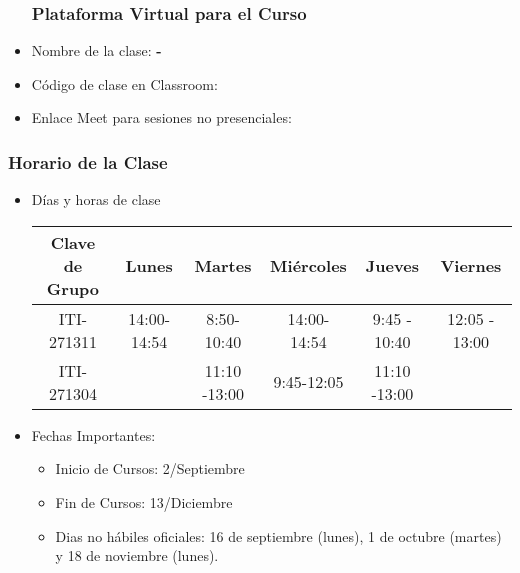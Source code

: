 


\begin{frame}
\begin{itemize}
\frametitle{Plataforma Virtual para el Curso}
\item Nombre de la clase: \textbf{\nombreMateria-\cuatrimestre}
\item Código de clase en Classroom: \textbf{\claveClassroom}
\item Enlace Meet para sesiones no presenciales: \textbf{\claveMeet}
\end{itemize}
\end{frame}



\begin{frame}
\frametitle{Horario de la Clase}


\begin{itemize}
\item Días y horas de clase
\tiny
\begin{spacing}{1.0}
\begin{center}
\begin{tabular}{c|ccccc}
\hline 
\textbf{Clave de Grupo}   & Lunes        & Martes       & Miércoles    & Jueves         & Viernes         \\  \hline 
ITI-271311                & 14:00- 14:54 &  8:50- 10:40 & 14:00-14:54  &  9:45 - 10:40  & 12:05 - 13:00  \\
ITI-271304                &              & 11:10 -13:00 &  9:45-12:05  &  11:10 -13:00  &                \\      
\hline
\end{tabular}
\end{center}
\end{spacing}
\normalsize
\item Fechas Importantes:
\begin{itemize}
\item Inicio de Cursos: 2/Septiembre
\item Fin de Cursos: 13/Diciembre
\item Dias no hábiles oficiales: 16 de septiembre (lunes), 1 de octubre (martes) y 18 de noviembre (lunes).
\end{itemize}
\end{itemize}

\end{frame}


